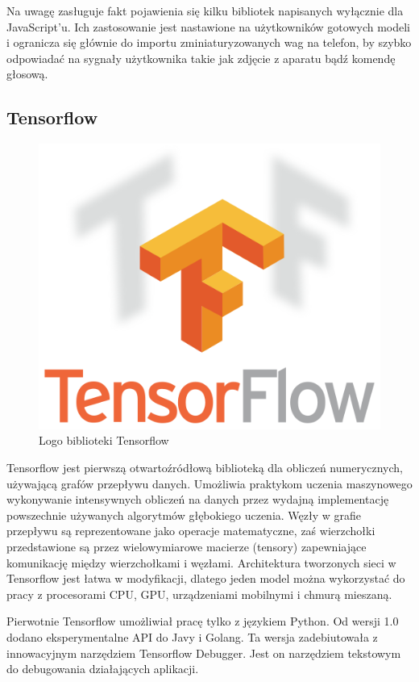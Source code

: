 \documentclass[12pt,a4paper,twoside,titlepage,openright]{book}
\begin{document}
Na uwagę zasługuje fakt pojawienia się kilku bibliotek napisanych wyłącznie dla JavaScript'u. Ich zastosowanie jest nastawione na użytkowników gotowych modeli i ogranicza się głównie do importu zminiaturyzowanych wag na telefon, by szybko odpowiadać na sygnały użytkownika takie jak zdjęcie z aparatu bądź komendę głosową. 

\subsection{Tensorflow}
\begin{figure}[ht]
	\centering
			\includegraphics[resolution=100, scale=0.6]{Tensorflow.png}
		\caption{Logo biblioteki Tensorflow}
\end{figure}

Tensorflow jest pierwszą otwartoźródłową biblioteką dla obliczeń numerycznych, używającą grafów przepływu danych. Umożliwia praktykom uczenia maszynowego wykonywanie intensywnych obliczeń na danych przez wydajną implementację powszechnie używanych algorytmów głębokiego uczenia. Węzły w grafie przepływu są reprezentowane jako operacje matematyczne, zaś wierzchołki przedstawione są przez wielowymiarowe macierze (tensory) zapewniające komunikację między wierzchołkami i węzłami. Architektura tworzonych sieci w Tensorflow jest łatwa w modyfikacji, dlatego jeden model można wykorzystać do pracy z procesorami CPU, GPU, urządzeniami mobilnymi i chmurą mieszaną. \cite{DeepLearningTensorflow}

Pierwotnie Tensorflow umożliwiał pracę tylko z językiem Python. Od wersji 1.0 dodano eksperymentalne API do Javy i Golang. Ta wersja zadebiutowała z innowacyjnym narzędziem Tensorflow Debugger. Jest on narzędziem tekstowym do debugowania działających aplikacji.
\end{document}
